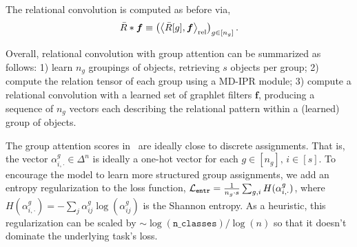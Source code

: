 The relational convolution is computed as before via,
\begin{equation}
    \bar{R} \ast \bm{f} \equiv \left(\left\langle \bar{R}[g], \bm{f} \right\rangle_\mathrm{rel}\right)_{g \in [n_g]}.
\end{equation}

Overall, relational convolution with group attention can be summarized as follows: 1) learn $n_g$ groupings of objects, retrieving $s$ objects per group; 2) compute the relation tensor of each group using a MD-IPR module; 3) compute a relational convolution with a learned set of graphlet filters $\bm{f}$, producing a sequence of $n_g$ vectors each describing the relational pattern within a (learned) group of objects.

The group attention scores in~ are ideally close to discrete assignments. That is, the vector $\alpha_{i,\cdot}^{g} \in \Delta^{n}$ is ideally a one-hot vector for each $g \in [n_g],\, i \in [s]$. To encourage the model to learn more structured group assignments, we add an entropy regularization to the loss function, ${\mathcal{L}}_{\mathtt{entr}} = \frac{1}{n_g \cdot s} \sum_{g, i} H(\alpha_{i,\cdot}^{g})$, where $H(\alpha_{i,\cdot}^{g}) = - \sum_{j} \alpha_{ij}^{g} \log(\alpha_{ij}^g)$ is the Shannon entropy. As a heuristic, this regularization can be scaled by $\sim \log(\mathtt{n\_classes}) / \log(n)$ so that it doesn't dominate the underlying task's loss.